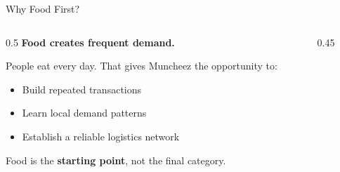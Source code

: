 \documentclass[aspectratio=169]{beamer}
\newcommand{\sectiontitle}[1]{\textbf{\large #1}}
\begin{document}
\begin{frame}{Why Food First?}
  \begin{columns}[T]
    \begin{column}{0.5\textwidth}
      \sectiontitle{Food creates frequent demand.}
      \vspace{4mm}
      
      People eat every day. That gives Muncheez the opportunity to:
      
      \vspace{3mm}
      \begin{itemize}
        \item Build repeated transactions
        \item Learn local demand patterns
        \item Establish a reliable logistics network
      \end{itemize}
      
      \vspace{4mm}
      Food is the \textbf{starting point}, not the final category.
    \end{column}
    \begin{column}{0.45\textwidth}
    \end{column}
  \end{columns}
\end{frame}
\end{document}
